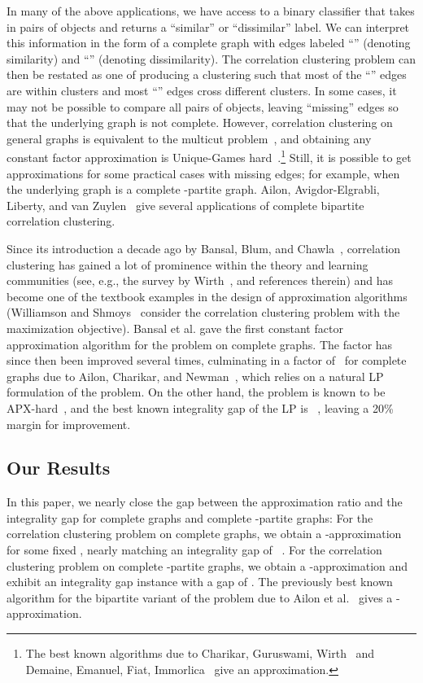 \documentclass[11pt]{article}
\theoremstyle{definition}
\theoremstyle{remark}
\begin{document}
In many of the above applications, we have access to a binary classifier that
takes in pairs of objects and returns a ``similar'' or ``dissimilar'' label. We
can interpret this information in the form of a complete graph with edges
labeled ``'' (denoting  similarity) and ``'' (denoting dissimilarity).
The correlation clustering problem can then be restated as one of producing a
clustering such that most of the ``'' edges are within clusters and most
``'' edges cross different clusters. In some cases, it may not be possible
to compare all pairs of objects, leaving ``missing'' edges so that the underlying
graph is not complete. However, correlation clustering on general
graphs is equivalent to the multicut problem~\cite{DEFI06}, and obtaining any
constant factor approximation is Unique-Games hard~\cite{CKKRS06}.\footnote{The
best known algorithms due to Charikar, Guruswami, Wirth~\cite{CGW05} and  
Demaine, Emanuel, Fiat, Immorlica~\cite{DEFI06}
give an  approximation.}
Still, it is possible to get approximations for some practical cases with
missing edges; for example, when the underlying graph is a complete -partite graph.
Ailon, Avigdor-Elgrabli, Liberty, and van
Zuylen~\cite{AALZ12} give several applications of complete bipartite
correlation clustering.


Since its introduction a decade ago by Bansal, Blum, and Chawla~\cite{BBC04},
correlation clustering has gained a lot of prominence within the theory and
learning communities (see, e.g., the survey by Wirth~\cite{Wirth10}, and
references therein) and has become one of the textbook examples in the design
of approximation algorithms (Williamson and Shmoys~\cite{WS11}
consider the correlation clustering problem with the maximization objective).
Bansal et al. gave the first constant factor approximation algorithm for the
problem on complete graphs. The factor
has since then been improved several times, culminating in a factor of~
for complete graphs due to Ailon, Charikar, and Newman~\cite{ACN08}, which
relies on a natural LP formulation of the problem. On the other hand, the
problem is known to be APX-hard~\cite{DEFI06}, and the best known integrality
gap of the LP is ~\cite{CGW05}, leaving a 20\% margin for improvement.

\subsection{Our Results}
In this paper, we nearly close the gap between
the approximation ratio and the integrality gap for complete graphs and complete
-partite graphs:
For the correlation clustering problem on complete graphs, we obtain a
-approximation for some fixed , nearly matching an integrality gap of ~\cite{CGW05}.
For the correlation clustering problem on complete -partite graphs,
we obtain a -approximation and exhibit an integrality gap instance with
a gap of .  The previously best known algorithm for the bipartite variant
of the problem due to Ailon et al.~\cite{AALZ12} gives
a -approximation.
\end{document}
